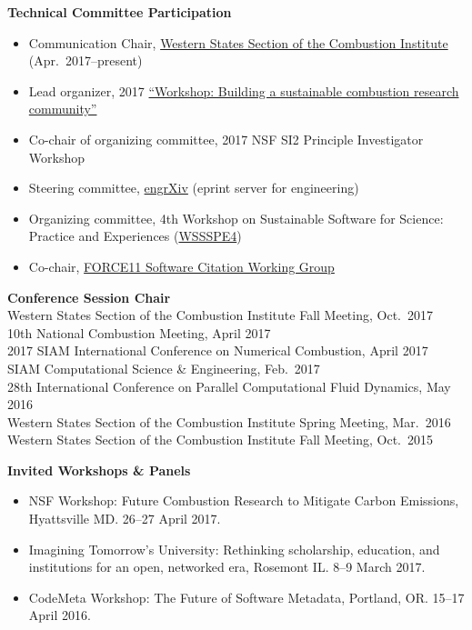 \documentclass[margin,line,11pt]{res}
\begin{document}
\begin{resume}
\textbf{Technical Committee Participation}
\begin{itemize}[leftmargin=*]
\item Communication Chair, \href{http://wssci.us/}{Western States Section of the Combustion Institute} (Apr.~2017--present)
\item Lead organizer, 2017 \href{https://combustion-community-workshop-2017.github.io/}{``Workshop: Building a sustainable combustion research community''}
\item Co-chair of organizing committee, 2017 NSF SI2 Principle Investigator Workshop
\item Steering committee, \href{http://blog.engrxiv.org/}{engrXiv} (eprint server for engineering)
\item Organizing committee, 4th Workshop on Sustainable Software for Science: Practice and Experiences (\href{http://wssspe.researchcomputing.org.uk/wssspe4/}{WSSSPE4})
\item Co-chair, \href{https://www.force11.org/group/software-citation-working-group}{FORCE11 Software Citation Working Group}
\end{itemize}

\textbf{Conference Session Chair} \\
Western States Section of the Combustion Institute Fall Meeting, Oct.\ 2017 \\
10th National Combustion Meeting, April 2017 \\
2017 SIAM International Conference on Numerical Combustion, April 2017 \\
SIAM Computational Science \& Engineering, Feb.\ 2017 \\
28th International Conference on Parallel Computational Fluid Dynamics, May 2016 \\
Western States Section of the Combustion Institute Spring Meeting, Mar.\ 2016 \\
Western States Section of the Combustion Institute Fall Meeting, Oct.\ 2015

\textbf{Invited Workshops \& Panels}
\begin{itemize}[leftmargin=*]
    \item NSF Workshop: Future Combustion Research to Mitigate Carbon Emissions, Hyattsville MD. 26--27 April 2017.
    \item Imagining Tomorrow's University: Rethinking scholarship, education, and institutions for an open, networked era, Rosemont IL. 8--9 March 2017.
    \item CodeMeta Workshop: The Future of Software Metadata, Portland, OR. 15--17 April 2016.
\end{itemize}


\end{resume}
\end{document}
